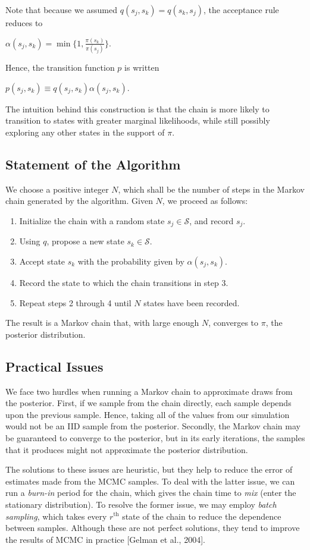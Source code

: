 \documentclass[12pt,twoside]{reedthesis}
\begin{document}
			Note that because we assumed $q(s_j,s_k) = q(s_k, s_j)$, the acceptance rule reduces to
			\begin{center} 
			$
			\alpha(s_j,s_k) = \min\{1, \frac{\pi(s_k)}{\pi(s_j)}\}.
			$
			\end{center}
			Hence, the transition function $p$ is written
			\begin{center}
				$p(s_j,s_k) \equiv q(s_j,s_k) \alpha(s_j,s_k)$.
			\end{center}
			The intuition behind this construction is that the chain is more likely to transition to states
			with greater marginal likelihoods, while still possibly exploring any other states in the support of $\pi$.
		\subsection*{Statement of the Algorithm}
			We choose a positive integer $N$, 
			which shall be the number of steps in the Markov chain generated by the algorithm.
			Given $N$, we proceed as follows:
			\begin{enumerate}
				\item Initialize the chain with a random state $s_j \in \mathcal S$, and record $s_j$.
				\item Using $q$, propose a new state $s_k \in \mathcal S$.
				\item Accept state $s_k$ with the probability given by $\alpha(s_j,s_k)$. 
				\item Record the state to which the chain transitions in step 3.
				\item Repeat steps 2 through 4 until $N$ states have been recorded.
			\end{enumerate}
			The result is a Markov chain that, with large enough $N$, 
			converges to $\pi$, the posterior distribution.
		\subsection*{Practical Issues}
			We face two hurdles when running a Markov chain to approximate draws from the posterior. 
			First, if we sample from the chain directly, each sample depends upon the previous sample. 
			Hence, taking all of the values from our simulation would not be an IID sample from the posterior. 
			Secondly, the Markov chain may be guaranteed to converge to the posterior, but in its early iterations, the samples that it produces might not approximate the posterior distribution. 
			
			The solutions to these issues are heuristic, but they help to reduce the error of estimates made from the MCMC samples. 
			To deal with the latter issue, we can run a {\em burn-in} period for the chain, which gives the chain time to {\em mix} (enter the stationary distribution). 
			To resolve the former issue, we may employ {\em batch sampling}, which takes every $r^{\text{th}}$ state of the chain to reduce the dependence between samples.
			Although these are not perfect solutions, they tend to improve the results of MCMC in practice [Gelman et al., 2004].
			
\end{document}
